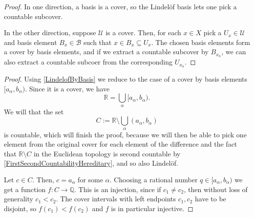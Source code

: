 
\begin{proof}
    In one direction, a basis is a cover, so the Lindel\"of basis lets one pick a countable subcover.

    In the other direction, suppose \( \mathcal{U} \) is a cover. Then, for each \( x \in X \) pick a \( U_x \in \mathcal{U} \) and basis element \( B_x \in \mathcal{B} \) such that \( x \in B_x \subseteq U_x \). The chosen basis elements form a cover by basis elements, and if we extract a countable subcover by \( B_{x_n} \), we can also extract a countable subcoer from the corresponding \( U_{x_n} \). 
\end{proof}


\begin{proof}
    Using \ref{LindelofByBasis} we reduce to the case of a cover by basis elements \( [a_\alpha, b_\alpha) \). Since it is a cover, we have
    \[ 
        \mathbb{R} = \bigcup_{\alpha} [a_\alpha, b_\alpha).
   \]
   We will that the set
   \[ 
       C := \mathbb{R} \setminus \bigcup_{\alpha} (a_\alpha, b_\alpha) 
  \]
  is countable, which will finish the proof, because we will then be able to pick one element from the original cover for each element of the difference and the fact that \( \mathbb{R} \setminus C \) in the Euclidean topology is second countable by \ref{FirstSecondCountabilityHereditary}, and so also Lindel\"of.

  Let \( c \in C \). Then, \( c = a_\alpha \) for some \( \alpha \). Choosing a rational number \( q \in [a_\alpha, b_\alpha) \) we get a function \( f: C \to \mathbb{Q} \). This is an injection, since if \( c_1 \neq c_2 \), then without loss of generality \( c_1 < c_2 \). The cover intervals with left endpoints \( c_1, c_2 \) have to be disjoint, so \( f(c_1) < f(c_2) \) and \( f \) is in particular injective.
\end{proof}

